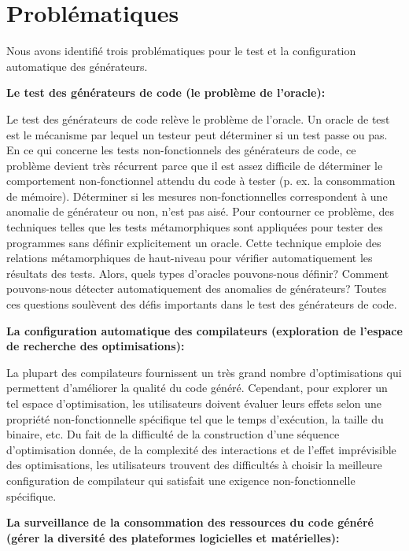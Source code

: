 \section*{Probl\'ematiques}
Nous avons identifi\'e trois probl\'ematiques pour le test et la configuration automatique des g\'en\'erateurs.

\textbf{Le test des g\'en\'erateurs de code (le probl\`eme de l'oracle):} 

Le test des g\'en\'erateurs de code rel\`eve le probl\`eme de l'oracle. Un oracle de test est le m\'ecanisme par lequel un testeur peut d\'eterminer si un test passe ou pas. En ce qui 
concerne les tests non-fonctionnels des g\'en\'erateurs de code, ce probl\`eme devient tr\`es r\'ecurrent parce que il est assez difficile de d\'eterminer le comportement non-fonctionnel attendu du code \`a tester (p. ex. la consommation de m\'emoire). D\'eterminer si les mesures non-fonctionnelles correspondent \`a une anomalie de g\'en\'erateur ou non, n'est pas ais\'e. Pour contourner ce probl\`eme, des techniques telles que les tests m\'etamorphiques\cite{chen1998metamorphic} sont appliqu\'ees pour tester des programmes sans d\'efinir explicitement un oracle. Cette technique emploie des relations m\'etamorphiques de haut-niveau pour v\'erifier automatiquement les r\'esultats des tests. Alors, quels types d'oracles pouvons-nous d\'efinir? Comment pouvons-nous d\'etecter automatiquement des anomalies de g\'en\'erateurs? Toutes ces questions soul\`event des d\'efis importants dans le test des g\'en\'erateurs de code.


\textbf{La configuration automatique des compilateurs (exploration de l'espace de recherche des optimisations):}

La plupart des compilateurs fournissent un tr\`es grand nombre d'optimisations qui permettent d'am\'eliorer la qualit\'e du code g\'en\'er\'e. Cependant, pour explorer un tel espace d'optimisation, les utilisateurs doivent \'evaluer leurs effets selon une propri\'et\'e non-fonctionnelle sp\'ecifique tel que le temps d'ex\'ecution, la taille du binaire, etc. Du fait de la difficult\'e de la construction d'une s\'equence d'optimisation donn\'ee, de la complexit\'e des interactions et de l'effet impr\'evisible des optimisations, les utilisateurs trouvent des difficult\'es \`a choisir la meilleure configuration de compilateur qui satisfait une exigence non-fonctionnelle sp\'ecifique.


\textbf{La surveillance de la consommation des ressources du code g\'en\'er\'e (g\'erer la diversit\'e des plateformes logicielles et mat\'erielles):}

